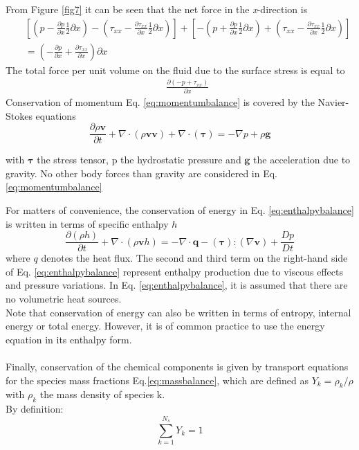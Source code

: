 From Figure \ref{fig7} it can be seen that the net force in the \textit{x}-direction is
\begin{align}
	&&\left[\left( p - \frac{\partial p}{\partial x}\frac{1}{2}\partial x\right)- \left( \tau_{xx} - \frac{\partial \tau_{xx}}{\partial x}\frac{1}{2}\partial x\right)\right] + 	\left[-\left( p + \frac{\partial p}{\partial x}\frac{1}{2}\partial x\right)+ \left( \tau_{xx} - \frac{\partial \tau_{xx}}{\partial x}\frac{1}{2}\partial x\right)\right] \nonumber \\ &&= \left(-\frac{\partial p}{\partial x} + \frac{\partial \tau_{xx}}{\partial x}\right) \partial x
\end{align}
The total force per unit volume on the fluid due to the surface stress is equal to 
\begin{align}
	&&\frac{\partial (-p + \tau_{xx})}{\partial x} 
\end{align}
Conservation of momentum Eq. \ref{eq:momentumbalance} is covered by the Navier-Stokes equations
\begin{equation}
\frac{\partial \rho \mathbf{v}}{\partial t} + \nabla \cdot (\rho \mathbf{v} \mathbf{v}) + \nabla \cdot (\boldsymbol{\tau})= -\nabla p + \rho \mathbf{g}
\label{eq:momentumbalance}
\end{equation}

with $\boldsymbol{\tau}$ the stress tensor, p the hydrostatic pressure and $\mathbf{g}$ the acceleration due to gravity. No other body forces than gravity are considered in Eq. \ref{eq:momentumbalance}

For matters of convenience, the conservation of energy in Eq. \ref{eq:enthalpybalance} is written in terms of specific enthalpy $h$
\begin{equation}
\frac{\partial (\rho h)}{\partial t} + \nabla \cdot (\rho \mathbf{v}  h) 
= - \nabla \cdot \mathbf{q} - (\boldsymbol\tau) \colon (\nabla \mathbf{v}) + \frac{D p}{D t}
\label{eq:enthalpybalance}
\end{equation}
where $q$ denotes the heat flux. The second and third term on the right-hand side of Eq. \ref{eq:enthalpybalance} represent enthalpy production due to viscous effects and pressure variations. In Eq. \ref{eq:enthalpybalance}, it is assumed that there are no volumetric heat sources. \\
Note that conservation of energy can also be written in terms of entropy, internal energy or total energy. However, it is of common practice to use the energy equation in its enthalpy form.\\ \\ Finally, conservation of the chemical components is given by transport equations for the species mass fractions Eq.\ref{eq:massbalance}, which are defined as  $Y_k = \rho_k/\rho$ with $\rho_k$ the mass density of species k. \\ By definition:
\begin{equation}
\sum_{k=1}^{N_s} Y_k = 1
\end{equation}


